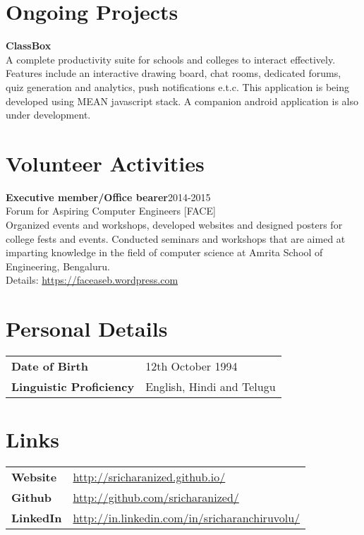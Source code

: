 \documentclass[margin]{res}
\begin{document}
\begin{resume}
 \section{Ongoing Projects}
{\bf ClassBox} \\ A complete productivity suite for schools and colleges to interact effectively. Features include an interactive drawing board, chat rooms, dedicated forums, quiz generation and analytics, push notifications e.t.c. This application is being developed using MEAN javascript stack. A companion android application is also under development.


\section{Volunteer  Activities} 
{\bf Executive member/Office bearer}\hfill  2014-2015\\ Forum for Aspiring Computer Engineers [FACE] \\Organized events and workshops, developed websites and designed posters for college fests and events. Conducted seminars and workshops that are aimed at imparting knowledge in the field of computer science at Amrita School of Engineering, Bengaluru. \\ Details: \underline{https://faceaseb.wordpress.com}
                

\section{Personal Details}
\begin{tabular}{l p{3.5in}}
      \bf{Date of Birth} & \hfill 12th October 1994\\
			\bf{Linguistic Proficiency} & \hfill  English, Hindi and Telugu\\
 \end{tabular}
\section{Links}
\begin{tabular}{l p{3.5in}}
      \bf{Website} & \hfill \underline{http://sricharanized.github.io/}\\
			\bf{Github} & \hfill  \underline{http://github.com/sricharanized/}\\
			\bf{LinkedIn} & \hfill  \underline{http://in.linkedin.com/in/sricharanchiruvolu/}\\
 \end{tabular}


\end{resume}
\end{document}
